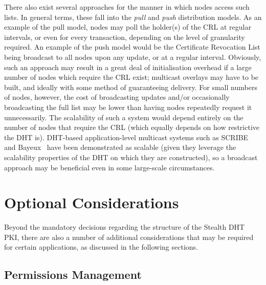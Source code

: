 \documentclass{elsart3p}
\begin{document}
There also exist several approaches for the manner in which nodes
access such lists. In general terms, these fall into the \emph{pull}
and \emph{push} distribution models. As an example of the pull
model, nodes may poll the holder(s) of the CRL at regular intervals,
or even for every transaction, depending on the level of granularity
required. An example of the push model would be the Certificate
Revocation List being broadcast to all nodes upon any update, or at
a regular interval. Obviously, such an approach may result in a
great deal of initialisation overhead if a large number of nodes
which require the CRL exist; multicast overlays may have to be
built, and ideally with some method of guaranteeing delivery. For
small numbers of nodes, however, the cost of broadcasting updates
and/or occasionally broadcasting the full list may be lower than
having nodes repeatedly request it unnecessarily. The scalability of
such a system would depend entirely on the number of nodes that
require the CRL (which equally depends on how restrictive the DHT
is). DHT-based application-level multicast systems such as
SCRIBE~\cite{Castro02Scribe} and Bayeux~\cite{Zhuang01Bayeux} have
been demonstrated as scalable (given they leverage the scalability
properties of the DHT on which they are constructed), so a broadcast
approach may be beneficial even in some large-scale circumstances.

\section{Optional Considerations}
\label{sect-optional}

Beyond the mandatory decisions regarding the structure of the
Stealth DHT PKI, there are also a number of additional
considerations that may be required for certain applications, as
discussed in the following sections.

\subsection{Permissions Management}
\label{subsect-permissions}

%
\end{document}
